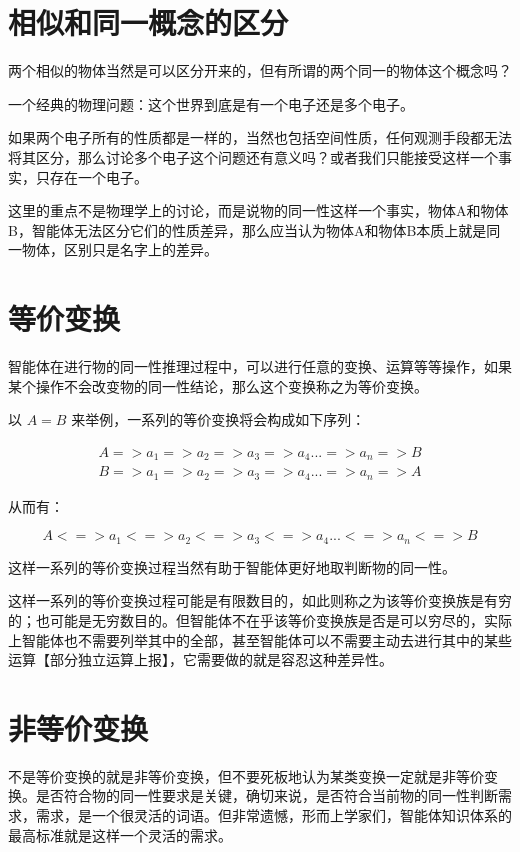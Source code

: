 \documentclass[12pt,oneside]{book}
\begin{document}
\section{相似和同一概念的区分}
两个相似的物体当然是可以区分开来的，但有所谓的两个同一的物体这个概念吗？

一个经典的物理问题：这个世界到底是有一个电子还是多个电子。

如果两个电子所有的性质都是一样的，当然也包括空间性质，任何观测手段都无法将其区分，那么讨论多个电子这个问题还有意义吗？或者我们只能接受这样一个事实，只存在一个电子。

这里的重点不是物理学上的讨论，而是说物的同一性这样一个事实，物体A和物体B，智能体无法区分它们的性质差异，那么应当认为物体A和物体B本质上就是同一物体，区别只是名字上的差异。




\section{等价变换}
智能体在进行物的同一性推理过程中，可以进行任意的变换、运算等等操作，如果某个操作不会改变物的同一性结论，那么这个变换称之为等价变换。

以 $A=B$ 来举例，一系列的等价变换将会构成如下序列：

\begin{align*}
A => a_1 => a_2 => a_3 => a_4 ... => a_n => B \\
B => a_1 => a_2 => a_3 => a_4 ... => a_n => A
\end{align*}

从而有：

\[
A <=> a_1 <=> a_2 <=> a_3 <=> a_4 ... <=> a_n <=> B 
\]

这样一系列的等价变换过程当然有助于智能体更好地取判断物的同一性。

这样一系列的等价变换过程可能是有限数目的，如此则称之为该等价变换族是有穷的；也可能是无穷数目的。但智能体不在乎该等价变换族是否是可以穷尽的，实际上智能体也不需要列举其中的全部，甚至智能体可以不需要主动去进行其中的某些运算【部分独立运算上报】，它需要做的就是容忍这种差异性。


\section{非等价变换}
不是等价变换的就是非等价变换，但不要死板地认为某类变换一定就是非等价变换。是否符合物的同一性要求是关键，确切来说，是否符合当前物的同一性判断需求，需求，是一个很灵活的词语。但非常遗憾，形而上学家们，智能体知识体系的最高标准就是这样一个灵活的需求。
\end{document}
